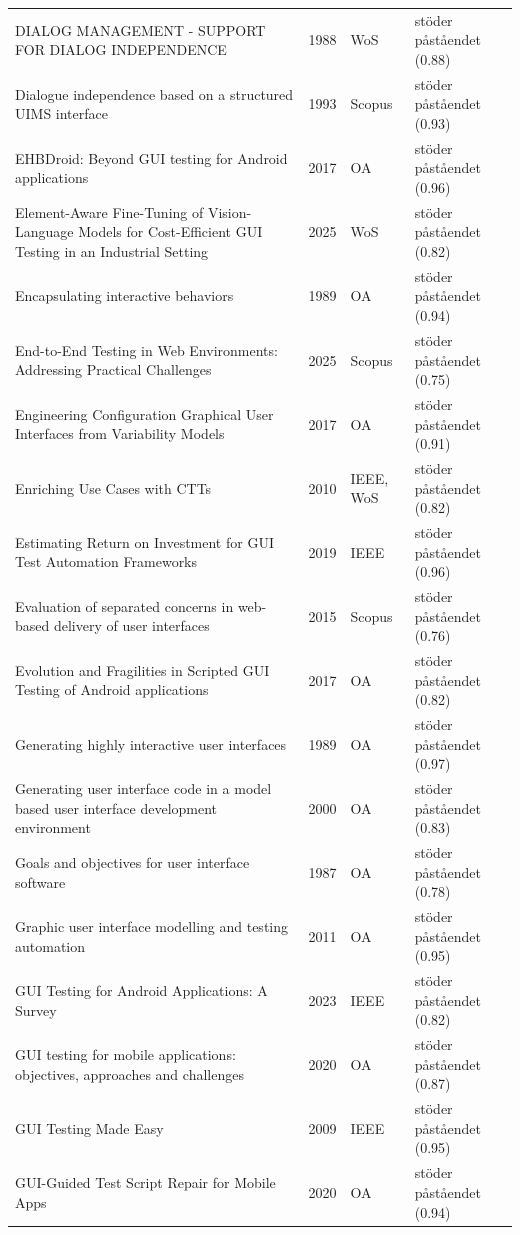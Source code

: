 \begin{longtable}{@{}%
  >{\raggedright\arraybackslash}p{}c%
  >{\raggedright\arraybackslash}p{}%
  >{\raggedright\arraybackslash}p{}@{}}
DIALOG MANAGEMENT - SUPPORT FOR DIALOG INDEPENDENCE & 1988 & WoS & stöder påståendet (0.88) \\
Dialogue independence based on a structured UIMS interface & 1993 & Scopus & stöder påståendet (0.93) \\
EHBDroid: Beyond GUI testing for Android applications & 2017 & OA & stöder påståendet (0.96) \\
Element-Aware Fine-Tuning of Vision-Language Models for Cost-Efficient GUI Testing in an Industrial Setting & 2025 & WoS & stöder påståendet (0.82) \\
Encapsulating interactive behaviors & 1989 & OA & stöder påståendet (0.94) \\
End-to-End Testing in Web Environments: Addressing Practical Challenges & 2025 & Scopus & stöder påståendet (0.75) \\
Engineering Configuration Graphical User Interfaces from Variability Models & 2017 & OA & stöder påståendet (0.91) \\
Enriching Use Cases with CTTs & 2010 & IEEE, WoS & stöder påståendet (0.82) \\
Estimating Return on Investment for GUI Test Automation Frameworks & 2019 & IEEE & stöder påståendet (0.96) \\
Evaluation of separated concerns in web-based delivery of user interfaces & 2015 & Scopus & stöder påståendet (0.76) \\
Evolution and Fragilities in Scripted GUI Testing of Android applications & 2017 & OA & stöder påståendet (0.82) \\
Generating highly interactive user interfaces & 1989 & OA & stöder påståendet (0.97) \\
Generating user interface code in a model based user interface development environment & 2000 & OA & stöder påståendet (0.83) \\
Goals and objectives for user interface software & 1987 & OA & stöder påståendet (0.78) \\
Graphic user interface modelling and testing automation & 2011 & OA & stöder påståendet (0.95) \\
GUI Testing for Android Applications: A Survey & 2023 & IEEE & stöder påståendet (0.82) \\
GUI testing for mobile applications: objectives, approaches and challenges & 2020 & OA & stöder påståendet (0.87) \\
GUI Testing Made Easy & 2009 & IEEE & stöder påståendet (0.95) \\
GUI-Guided Test Script Repair for Mobile Apps & 2020 & OA & stöder påståendet (0.94) \\

\end{longtable}
